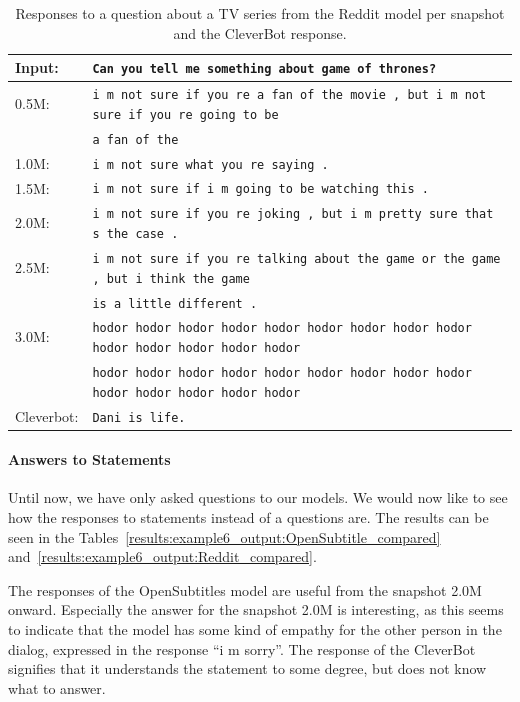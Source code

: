 \begin{table}[H]
	\centering
	\begin{adjustbox}{max width=\textwidth}
		\begin{tabularx}{\textwidth}{lX}
			\toprule
			Input: 	& \texttt{Can you tell me something about game of thrones?}\\
			\midrule
			0.5M: 	& \texttt{i m not sure if you re a fan of the movie , but i m not sure if you re going to be}\\
			& \texttt{a fan of the}\\
			1.0M: 	& \texttt{i m not sure what you re saying .}\\
			1.5M:	& \texttt{i m not sure if i m going to be watching this .}\\
			2.0M:	& \texttt{i m not sure if you re joking , but i m pretty sure that s the case .}\\
			2.5M:	& \texttt{i m not sure if you re talking about the game or the game , but i think the game}\\
			& \texttt{is a little different .}\\
			3.0M:	& \texttt{hodor hodor hodor hodor hodor hodor hodor hodor hodor hodor hodor hodor hodor hodor }\\
			& \texttt{hodor hodor hodor hodor hodor hodor hodor hodor hodor hodor hodor hodor hodor hodor}\\
			Cleverbot:	& \texttt{Dani is life.}\\
			\bottomrule
		\end{tabularx}
	\end{adjustbox}
	\caption{Responses to a question about a TV series from the Reddit model per snapshot and the CleverBot response.}
	\label{results:example5_output:Reddit_compared}
\end{table}

\paragraph{Answers to Statements}
Until now, we have only asked questions to our models. We would now like to see how the responses to statements instead of a questions are. The results can be seen in the Tables~\ref{results:example6_output:OpenSubtitle_compared} and~\ref{results:example6_output:Reddit_compared}.

The responses of the OpenSubtitles model are useful from the snapshot 2.0M onward. Especially the answer for the snapshot 2.0M is interesting, as this seems to indicate that the model has some kind of empathy for the other person in the dialog, expressed in the response ``i m sorry''. The response of the CleverBot signifies that it understands the statement to some degree, but does not know what to answer.


